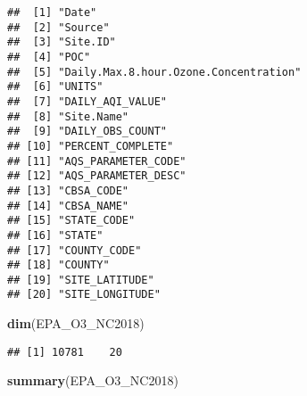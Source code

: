 \documentclass[]{article}
\newenvironment{Shaded}{\begin{snugshade}}{\end{snugshade}}
\newcommand{\KeywordTok}[1]{\textcolor[rgb]{0.13,0.29,0.53}{\textbf{#1}}}
\newcommand{\NormalTok}[1]{#1}
\begin{document}
\begin{verbatim}
##  [1] "Date"                                
##  [2] "Source"                              
##  [3] "Site.ID"                             
##  [4] "POC"                                 
##  [5] "Daily.Max.8.hour.Ozone.Concentration"
##  [6] "UNITS"                               
##  [7] "DAILY_AQI_VALUE"                     
##  [8] "Site.Name"                           
##  [9] "DAILY_OBS_COUNT"                     
## [10] "PERCENT_COMPLETE"                    
## [11] "AQS_PARAMETER_CODE"                  
## [12] "AQS_PARAMETER_DESC"                  
## [13] "CBSA_CODE"                           
## [14] "CBSA_NAME"                           
## [15] "STATE_CODE"                          
## [16] "STATE"                               
## [17] "COUNTY_CODE"                         
## [18] "COUNTY"                              
## [19] "SITE_LATITUDE"                       
## [20] "SITE_LONGITUDE"
\end{verbatim}

\begin{Shaded}
\begin{Highlighting}[]
\KeywordTok{dim}\NormalTok{(EPA_O3_NC2018)}
\end{Highlighting}
\end{Shaded}

\begin{verbatim}
## [1] 10781    20
\end{verbatim}

\begin{Shaded}
\begin{Highlighting}[]
\KeywordTok{summary}\NormalTok{(EPA_O3_NC2018)}
\end{Highlighting}
\end{Shaded}
\end{document}
